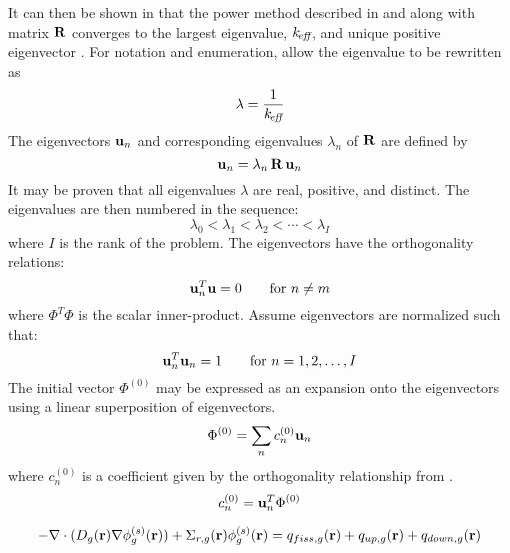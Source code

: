  It can then be shown in that the power method
  described in  and 
  along with matrix $\mathbf{R}$ converges to the largest eigenvalue, $k_{\!\mbox{\scriptsize \em eff}}$, and
  unique positive eigenvector \cite{nakamura}. For notation and enumeration,
  allow the eigenvalue to be rewritten as
  \begin{equation}
    \label{eq:lambda}
    \lambda = \frac{1}{k_{\!\mbox{\scriptsize \em eff}}}
  \end{equation}
  The eigenvectors $\mathbf{u}_n$ and
  corresponding eigenvalues $\lambda_n$ of $\mathbf{R}$ are defined by
  \begin{equation}
    \label{eq:eigen_definition}
    \mathbf{u}_n = \lambda_n \, \mathbf{R} \, \mathbf{u}_n
  \end{equation}
  It may be proven that all eigenvalues $\lambda$ are real, positive, and 
  distinct. The eigenvalues are then numbered in the sequence:
  \[ \lambda_0 < \lambda_1 < \lambda_2 < \cdots < \lambda_I\]
  where $I$ is the rank of the problem. The eigenvectors have the orthogonality
  relations:
  \begin{equation}
    \label{eq:eigen_orthogonality}
    \mathbf{u}^T_n \mathbf{u}= 0  \qquad \text{for } n \ne m
  \end{equation}
  where $\Phi^T \Phi$ is the scalar inner-product. Assume eigenvectors are
  normalized such that:
  \begin{equation}
    \label{eq:eigen_normalization}
    \mathbf{u}_n^T \mathbf{u}_n = 1 \qquad \text{for } n = 1, 2, \ldots, I
  \end{equation}
  The initial vector $\Phi^{(0)}$ may be expressed as an expansion onto the
  eigenvectors using a linear superposition of eigenvectors.
  \begin{equation}
    \label{eq:eigen_expansion}
    \Phi^{(0)} = \sum_n c_n^{(0)} \mathbf{u}_n
  \end{equation}
  where $c_n^{(0)}$ is a coefficient given by the orthogonality relationship
  from .
  \begin{equation}
    \label{eq:eigen_cn}
    c_n^{(0)} = \mathbf{u}_n^T \Phi^{(0)}
  \end{equation}



  \begin{equation} \label{eq:multigroup_source_expand}
    -\mathbf{\nabla} \cdot (D_g(\mathbf{r}) \mathbf{\nabla} \phi_g^{(s)}(\mathbf{r})) + \Sigma_{r,g}(\mathbf{r})
    \phi_g^{(s)}(\mathbf{r}) = q_{fiss,g}(\mathbf{r}) + q_{up,g}(\mathbf{r}) + q_{down,g}(\mathbf{r})
  \end{equation}

